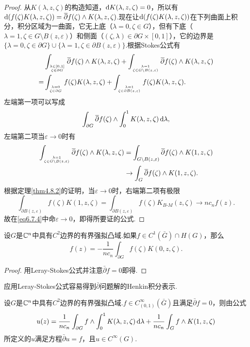 \begin{proof}
	从$K(\lambda,z,\zeta)$的构造知道，$\dif K(\lambda,z,\zeta)=0$，所以有$\dif (f(\zeta)K(\lambda,z,\zeta))=\bar{\partial}f(\zeta)\wedge K(\lambda,z,\zeta)$.现在让$\dif (f(\zeta)K(\lambda,z,\zeta))$在下列曲面上积分，积分区域为一曲面，它无上底（$\lambda=0,\zeta\in G$），但有下底（$\lambda=1,\zeta\in G\setminus B(z,\varepsilon)$）和侧面（$(\zeta,\lambda)\in\partial G\times[0,1]$），它的边界是$\{\lambda=0,\zeta\in\partial G\}\cup\{\lambda=1,\zeta\in\partial B(z,\varepsilon)\}$.根据Stokes公式有
	\begin{align}\label{eq6.7.4}
		&\int_{\lambda\in[0,1]\atop\zeta\in\partial G}\bar{\partial}f(\zeta)\wedge K(\lambda,z,\zeta)+\int_{\lambda=1\atop\zeta\in G\setminus B(z,\varepsilon)}\bar{\partial}f(\zeta)\wedge K(\lambda,z,\zeta)\notag\\
		=&\int_{\lambda=0\atop\zeta\in\partial G}f(\zeta)K(\lambda,z,\zeta)+\int_{\lambda=1\atop\zeta\in\partial B(z,\varepsilon)}f(\zeta)K(\lambda,z,\zeta).
	\end{align}
	左端第一项可以写成
	\[\int_{\partial G}\bar{\partial}f(\zeta)\wedge\int_{0}^{1}K(\lambda,z,\zeta)\dif\lambda,\]
	左端第二项当$\varepsilon\to0$时有
	\begin{align*}
		\int_{\lambda=1\atop\zeta\in G\setminus B(z,\varepsilon)}\bar{\partial}f(\zeta)\wedge K(\lambda,z,\zeta)
		&=\int_{G\setminus B(z,\varepsilon)}\bar{\partial}f(\zeta)\wedge K(1,z,\zeta)\\
		&\to\int_G \bar{\partial}f(\zeta)\wedge K(1,z,\zeta).
	\end{align*}
	根据定理\ref{thm4.8.2}的证明，当$\varepsilon\to0$时，右端第二项有极限
	\[\int_{\partial B(z,\varepsilon)}f(\zeta)K(1,z,\zeta)=\int_{\partial B(z,\varepsilon)}f(\zeta)K_{B\text{-}M}(z,\zeta)\to nc_nf(z).\]
	故在\eqref{eq6.7.4}中命$\varepsilon\to0$，即得所要证的公式.
\end{proof}
\begin{corollary}\label{cor6.7.6}
	设$G$是$\MC^n$中具有$C^2$边界的有界强拟凸域.如果$f\in C^1(\bar{G})\cap H(G)$，那么
	\[f(z)=-\frac1{nc_n}\int_{\partial G}f(\zeta)K(0,z,\zeta).\]
\end{corollary}
\begin{proof}
	用Leray-Stokes公式并注意$\bar{\partial}f=0$即得.
\end{proof}
应用Leray-Stokes公式容易得到$\bar{\partial}$问题解的Henkin积分表示.
\begin{theorem}\label{thm6.7.7}
	设$G$是$\MC^n$中具有$C^2$边界的有界强拟凸域.$f\in C_{(0,1)}^\infty(\bar{G})$且满足$\bar{\partial}f=0$，则由公式
	\begin{equation}\label{eq6.7.5}
		u(z)=\frac1{nc_n}\int_{\partial G}f\wedge\int_{0}^{1}K(\lambda,z,\zeta)\dif\lambda+\frac1{nc_n}\int_G f\wedge K(1,z,\zeta)
	\end{equation}
	所定义的$u$满足方程$\bar{\partial}u=f$，且$u\in C^\infty(G)$.
\end{theorem}
